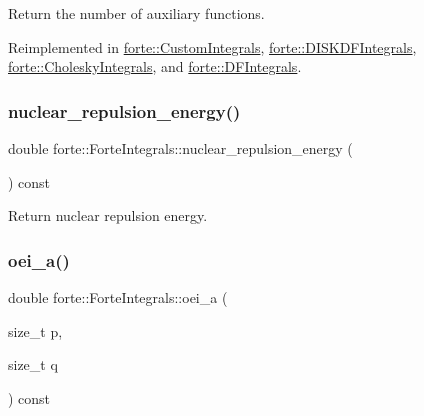 Return the number of auxiliary functions. 



Reimplemented in \mbox{\hyperlink{classforte_1_1_custom_integrals_aa8813730038bbc062d8e08d33600c27d}{forte\+::\+Custom\+Integrals}}, \mbox{\hyperlink{classforte_1_1_d_i_s_k_d_f_integrals_a56b38fd57064c9d6464f2173127835bd}{forte\+::\+D\+I\+S\+K\+D\+F\+Integrals}}, \mbox{\hyperlink{classforte_1_1_cholesky_integrals_a595f615fb37218eb03e862fb993151fa}{forte\+::\+Cholesky\+Integrals}}, and \mbox{\hyperlink{classforte_1_1_d_f_integrals_ac514e780990cdc0b3b594453eb63e901}{forte\+::\+D\+F\+Integrals}}.

\mbox{\label{classforte_1_1_forte_integrals_ae83c6f8ee941902655eb8dd27b993e2d}} 
\subsubsection{\texorpdfstring{nuclear\+\_\+repulsion\+\_\+energy()}{nuclear\_repulsion\_energy()}}
{\footnotesize\ttfamily double forte\+::\+Forte\+Integrals\+::nuclear\+\_\+repulsion\+\_\+energy (\begin{DoxyParamCaption}{ }\end{DoxyParamCaption}) const}



Return nuclear repulsion energy. 

\mbox{\label{classforte_1_1_forte_integrals_adeb8d675248cb181a502818b8a972908}} 
\subsubsection{\texorpdfstring{oei\+\_\+a()}{oei\_a()}}
{\footnotesize\ttfamily double forte\+::\+Forte\+Integrals\+::oei\+\_\+a (\begin{DoxyParamCaption}\item[{size\+\_\+t}]{p,  }\item[{size\+\_\+t}]{q }\end{DoxyParamCaption}) const}




